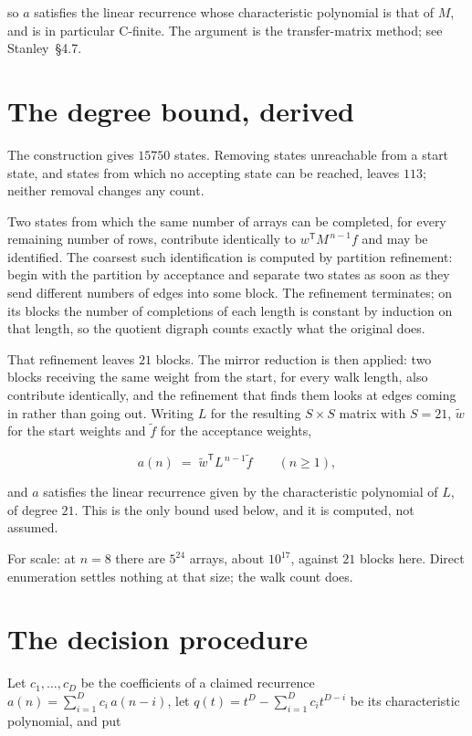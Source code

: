 \documentclass[11pt]{article}
\theoremstyle{definition}
\begin{document}
so $a$ satisfies the linear recurrence whose characteristic polynomial is that of $M$, and is in particular C-finite. The argument is the transfer-matrix method; see Stanley~\S4.7.

\section{The degree bound, derived}

The construction gives $15750$ states. Removing states unreachable from a start state, and states from which no accepting state can be reached, leaves $113$; neither removal changes any count.

Two states from which the same number of arrays can be completed, for every remaining number of rows, contribute identically to $w^{\mathsf T}M^{\,n-1}f$ and may be identified. The coarsest such identification is computed by partition refinement: begin with the partition by acceptance and separate two states as soon as they send different numbers of edges into some block. The refinement terminates; on its blocks the number of completions of each length is constant by induction on that length, so the quotient digraph counts exactly what the original does.

That refinement leaves $21$ blocks. The mirror reduction is then applied: two blocks receiving the same weight from the start, for every walk length, also contribute identically, and the refinement that finds them looks at edges coming in rather than going out. Writing $L$ for the resulting $S \times S$ matrix with $S = 21$, $\tilde w$ for the start weights and $\tilde f$ for the acceptance weights,

\[a(n) \;=\; \tilde w^{\mathsf T} L^{\,n-1} \tilde f \qquad (n \ge 1),\]

and $a$ satisfies the linear recurrence given by the characteristic polynomial of $L$, of degree $21$. This is the only bound used below, and it is computed, not assumed.

For scale: at $n = 8$ there are $5^{24}$ arrays, about $10^{17}$, against $21$ blocks here. Direct enumeration settles nothing at that size; the walk count does.

\section{The decision procedure}

Let $c_1,\dots,c_D$ be the coefficients of a claimed recurrence $a(n) = \sum_{i=1}^{D} c_i\,a(n-i)$, let $q(t) = t^{D} - \sum_{i=1}^{D} c_i t^{D-i}$ be its characteristic polynomial, and put
\end{document}
